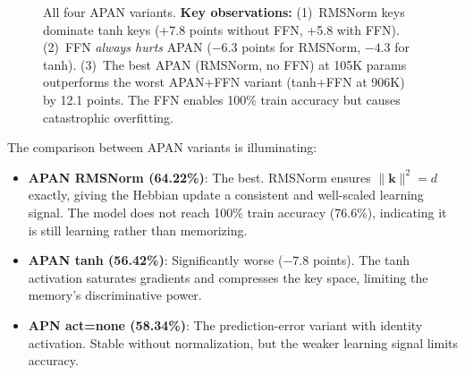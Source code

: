 \documentclass[11pt,a4paper]{article}
\begin{document}
\begin{figure}[h]
\centering
{}
\caption{All four APAN variants. \textbf{Key observations:} (1)~RMSNorm keys dominate tanh keys (+7.8 points without FFN, +5.8 with FFN). (2)~FFN \emph{always hurts} APAN ($-6.3$ points for RMSNorm, $-4.3$ for tanh). (3)~The best APAN (RMSNorm, no FFN) at 105K params outperforms the worst APAN+FFN variant (tanh+FFN at 906K) by 12.1 points. The FFN enables 100\% train accuracy but causes catastrophic overfitting.}
\label{fig:apan_variants}
\end{figure}

The comparison between APAN variants is illuminating:
\begin{itemize}
\item \textbf{APAN RMSNorm (64.22\%)}: The best. RMSNorm ensures $\|\mathbf{k}\|^2 = d$ exactly, giving the Hebbian update a consistent and well-scaled learning signal. The model does not reach 100\% train accuracy (76.6\%), indicating it is still learning rather than memorizing.
\item \textbf{APAN tanh (56.42\%)}: Significantly worse ($-7.8$ points). The tanh activation saturates gradients and compresses the key space, limiting the memory's discriminative power.
\item \textbf{APN act=none (58.34\%)}: The prediction-error variant with identity activation. Stable without normalization, but the weaker learning signal limits accuracy.
\end{itemize}
\end{document}
